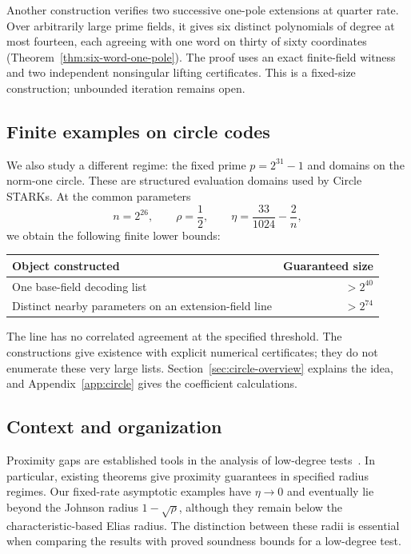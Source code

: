 \documentclass[11pt,letterpaper]{article}
\theoremstyle{definition}
\theoremstyle{remark}
\begin{document}
Another construction verifies two successive one-pole extensions at
quarter rate. Over arbitrarily large prime fields, it gives six distinct
polynomials of degree at most fourteen, each agreeing with one word on
thirty of sixty coordinates (Theorem~\ref{thm:six-word-one-pole}).
The proof uses an exact finite-field witness and two independent
nonsingular lifting certificates. This is a fixed-size construction;
unbounded iteration remains open.

\subsection{Finite examples on circle codes}

We also study a different regime: the fixed prime $p=2^{31}-1$ and
domains on the norm-one circle. These are structured evaluation
domains used by Circle STARKs. At the common parameters
\[
 n=2^{26},\qquad \rho=\frac12,\qquad
 \eta=\frac{33}{1024}-\frac{2}{n},
\]
we obtain the following finite lower bounds:
\begin{center}
\begin{tabular}{lr}
\toprule
Object constructed & Guaranteed size\\
\midrule
One base-field decoding list & $>2^{40}$\\
Distinct nearby parameters on an extension-field line & $>2^{74}$\\
\bottomrule
\end{tabular}
\end{center}
The line has no correlated agreement at the specified threshold.
The constructions give existence with explicit numerical certificates;
they do not enumerate these very large lists.
Section~\ref{sec:circle-overview} explains the idea, and
Appendix~\ref{app:circle} gives the coefficient calculations.

\subsection{Context and organization}

Proximity gaps are established tools in the analysis of low-degree
tests~\cite{bciks,bchks}. In particular, existing theorems give
proximity guarantees in specified radius regimes. Our fixed-rate
asymptotic examples have $\eta\to0$ and eventually lie beyond the
Johnson radius $1-\sqrt\rho$, although they remain below the
characteristic-based Elias radius. The distinction between these
radii is essential when comparing the results with proved soundness
bounds for a low-degree test.
\end{document}
